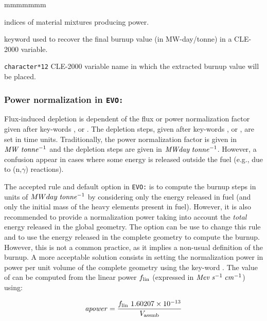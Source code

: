 \begin{ListeDeDescription}{mmmmmmm}
\item[\dusa{mixpwr}] indices of material mixtures producing power.

\item[\moc{PICK}]  keyword used to recover the final burnup value (in MW-day/tonne) in a CLE-2000 variable.

\item[\dusa{burnup}] \texttt{character*12} CLE-2000 variable name in which the extracted burnup value will be placed.

\end{ListeDeDescription}

\subsubsection{Power normalization in {\tt EVO:}}\label{sect:powerevo}

Flux-induced depletion is dependent of the flux or power normalization factor
given after key-words ,  or . The depletion
steps, given after key-words ,  or , are set
in time units. Traditionally, the power normalization factor is given in
${\it MW}\;{\it tonne}^{-1}$ and the depletion steps are given in
${\it MWday}\;{\it tonne}^{-1}$. However, a confusion appear in cases where
some energy is released outside the fuel (e.g., due to (n,$\gamma$) reactions).

\vskip 0.2cm

The accepted rule and default option in {\tt EVO:} is to compute the burnup
steps in units of $MWday\;{\it tonne}^{-1}$ by considering only the energy
released in fuel (and only the initial mass of the heavy elements present
in fuel). However, it is also recommended to provide a normalization power
taking into account the {\sl total} energy released in the global geometry.
The  option can be use to change this rule and to use
the energy released in the complete geometry to compute the burnup. However,
this is not a
common practice, as it implies a non-usual definition of the burnup.
A more acceptable solution consists in setting the normalization power
in power per unit volume of the complete geometry using the key-word
. The value of  can be computed from the linear
power $f_{\rm lin}$ (expressed in ${\it Mev}\;{\it s}^{-1}\;{\it cm}^{-1}$)
using:

\begin{equation}
{\it apower}={f_{\rm lin} \ 1.60207 \times 10^{-13} \over V_{\rm assmb}}
\label{eq:eq1}
\end{equation}

